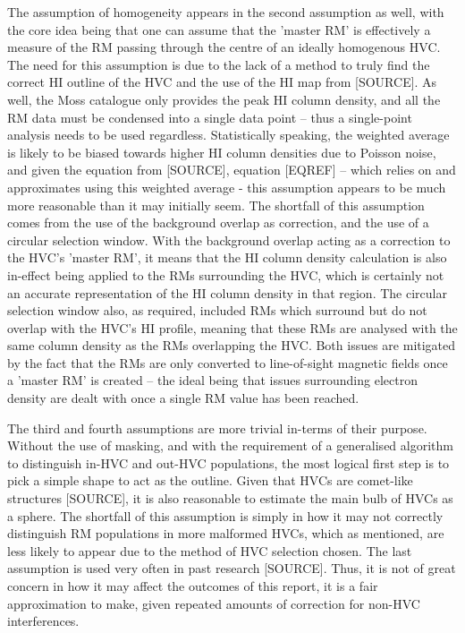 The assumption of homogeneity appears in the second assumption as well, with the core idea being that one can assume that the 'master RM' is effectively a measure of the RM passing through the centre of an ideally homogenous HVC. The need for this assumption is due to the lack of a method to truly find the correct HI outline of the HVC and the use of the HI map from [SOURCE]. As well, the Moss catalogue only provides the peak HI column density, and all the RM data must be condensed into a single data point – thus a single-point analysis needs to be used regardless.  Statistically speaking, the weighted average is likely to be biased towards higher HI column densities due to Poisson noise, and given the equation from [SOURCE], equation [EQREF] – which relies on and approximates using this weighted average - this assumption appears to be much more reasonable than it may initially seem. The shortfall of this assumption comes from the use of the background overlap as correction, and the use of a circular selection window. With the background overlap acting as a correction to the HVC's 'master RM', it means that the HI column density calculation is also in-effect being applied to the RMs surrounding the HVC, which is certainly not an accurate representation of the HI column density in that region. The circular selection window also, as required, included RMs which surround but do not overlap with the HVC's HI profile, meaning that these RMs are analysed with the same column density as the RMs overlapping the HVC. Both issues are mitigated by the fact that the RMs are only converted to line-of-sight magnetic fields once a 'master RM' is created – the ideal being that issues surrounding electron density are dealt with once a single RM value has been reached.


The third and fourth assumptions are more trivial in-terms of their purpose. Without the use of masking, and with the requirement of a generalised algorithm to distinguish in-HVC and out-HVC populations, the most logical first step is to pick a simple shape to act as the outline. Given that HVCs are comet-like structures [SOURCE], it is also reasonable to estimate the main bulb of HVCs as a sphere. The shortfall of this assumption is simply in how it may not correctly distinguish RM populations in more malformed HVCs, which as mentioned, are less likely to appear due to the method of HVC selection chosen. The last assumption is used very often in past research [SOURCE]. Thus, it is not of great concern in how it may affect the outcomes of this report, it is a fair approximation to make, given repeated amounts of correction for non-HVC interferences.


